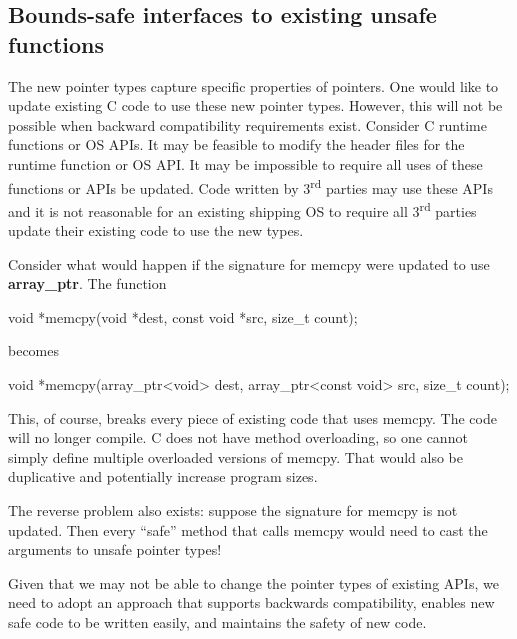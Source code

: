 \documentclass[]{article}
\begin{document}
\subsection{\texorpdfstring{\protect\hypertarget{ux5fToc426641113}{}{\protect\hypertarget{ux5fToc435434972}{}{\protect\hypertarget{ux5fToc437460803}{}{\protect\hypertarget{ux5fRef437611522}{}{\protect\hypertarget{ux5fToc440445484}{}{\protect\hypertarget{ux5fToc440449266}{}{\protect\hypertarget{ux5fToc440551916}{}{}}}}}}}Bounds-safe
interfaces to existing unsafe
functions}{Bounds-safe interfaces to existing unsafe functions}}\label{bounds-safe-interfaces-to-existing-unsafe-functions}

The new pointer types capture specific properties of pointers. One would
like to update existing C code to use these new pointer types. However,
this will not be possible when backward compatibility requirements
exist. Consider C runtime functions or OS APIs. It may be feasible to
modify the header files for the runtime function or OS API. It may be
impossible to require all uses of these functions or APIs be updated.
Code written by 3\textsuperscript{rd} parties may use these APIs and it
is not reasonable for an existing shipping OS to require all
3\textsuperscript{rd} parties update their existing code to use the new
types.

Consider what would happen if the signature for memcpy were updated to
use \textbf{array\_ptr}. The function

void *memcpy(void *dest, const void *src, size\_t count);

becomes

void *memcpy(array\_ptr\textless{}void\textgreater{} dest,
array\_ptr\textless{}const void\textgreater{} src, size\_t count);

This, of course, breaks every piece of existing code that uses memcpy.
The code will no longer compile. C does not have method overloading, so
one cannot simply define multiple overloaded versions of memcpy. That
would also be duplicative and potentially increase program sizes.

The reverse problem also exists: suppose the signature for memcpy is not
updated. Then every ``safe'' method that calls memcpy would need to cast
the arguments to unsafe pointer types!

Given that we may not be able to change the pointer types of existing
APIs, we need to adopt an approach that supports backwards
compatibility, enables new safe code to be written easily, and maintains
the safety of new code.
\end{document}

